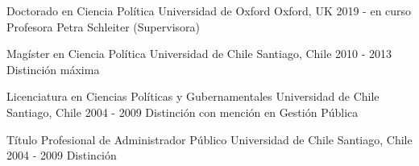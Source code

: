 





\begin{cventries}

\vspace{0.5mm}
\cventry
{Doctorado en Ciencia Política} 
{Universidad de Oxford} 
{Oxford, UK} 
{2019 - en curso} 
{Profesora Petra Schleiter (Supervisora)} \vspace{1.5mm}

\cventry
{Magíster en Ciencia Política} 
{Universidad de Chile} 
{Santiago, Chile} 
{2010 - 2013} 
{Distinción máxima} \vspace{1.5mm}

\cventry
{Licenciatura en Ciencias Políticas y Gubernamentales} 
{Universidad de Chile} 
{Santiago, Chile} 
{2004 - 2009} 
{Distinción con mención en Gestión Pública} \vspace{1.5mm}

\cventry
{Título Profesional de Administrador Público} 
{Universidad de Chile} 
{Santiago, Chile} 
{2004 - 2009} 
{Distinción}\vspace{1.5mm}

\end{cventries}
